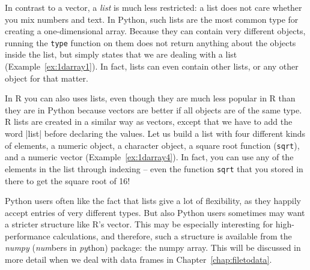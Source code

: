 In contrast to a vector, a \emph{list} is much less restricted: a list does not care
whether you mix numbers and text. In Python, such lists are the most common type for creating
a one-dimensional array. Because they
can contain very different objects, running the \texttt{type} function on them
does not return anything about the objects inside the list, but simply states that we
are dealing with a list (Example~\ref{ex:1darray1}).
In fact, lists can even contain other lists, or any other object for
that matter.

In R you can also uses lists, even though they are much less popular in R than
they are in Python because vectors are better if all objects are of the same type.
R lists are created in a similar way as vectors, except that we have to add the word |list|
before declaring the values. Let us build a list with four different
kinds of elements, a numeric object, a character object, a square root
function (\texttt{sqrt}), and a numeric vector (Example~\ref{ex:1darray4}). In fact, you
can use any of the elements in the list through indexing -- even the
function \texttt{sqrt} that you stored in there to get the square root of
16!


Python users often like the fact that lists give  a lot of flexibility, as they happily accept
entries of very different types. But also Python users sometimes may want a stricter
structure like R's vector. This may be especially interesting for
high-performance calculations, and therefore, such a structure is
available from the \emph{numpy} (\emph{num}bers in \emph{py}thon)
package: the numpy array.
This will be discussed in more detail when we deal with data frames in Chapter~\ref{chap:filetodata}.


